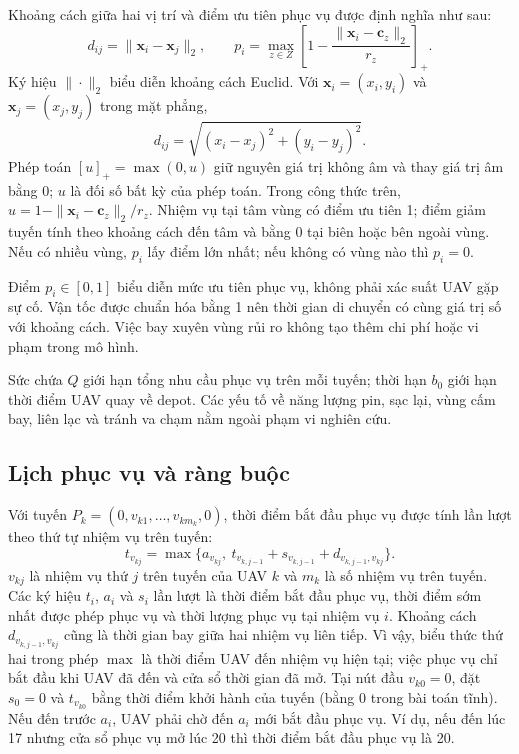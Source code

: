 \documentclass[11pt,a4paper]{article}
\begin{document}
Khoảng cách giữa hai vị trí và điểm ưu tiên phục vụ được định nghĩa như sau:
\begin{equation}
 d_{ij}=\|\mathbf{x}_i-\mathbf{x}_j\|_2,\qquad
 p_i=\max_{z\in Z}\left[1-\frac{\|\mathbf{x}_i-\mathbf{c}_z\|_2}{r_z}\right]_+.
\end{equation}
Ký hiệu $\|\cdot\|_2$ biểu diễn khoảng cách Euclid. Với $\mathbf{x}_i=(x_i,y_i)$ và $\mathbf{x}_j=(x_j,y_j)$ trong mặt phẳng,
\[
 d_{ij}=\sqrt{(x_i-x_j)^2+(y_i-y_j)^2}.
\]
Phép toán $[u]_+=\max(0,u)$ giữ nguyên giá trị không âm và thay giá trị âm bằng 0; $u$ là đối số bất kỳ của phép toán. Trong công thức trên, $u=1-\|\mathbf{x}_i-\mathbf{c}_z\|_2/r_z$. Nhiệm vụ tại tâm vùng có điểm ưu tiên 1; điểm giảm tuyến tính theo khoảng cách đến tâm và bằng 0 tại biên hoặc bên ngoài vùng. Nếu có nhiều vùng, $p_i$ lấy điểm lớn nhất; nếu không có vùng nào thì $p_i=0$.

Điểm $p_i\in[0,1]$ biểu diễn mức ưu tiên phục vụ, không phải xác suất UAV gặp sự cố. Vận tốc được chuẩn hóa bằng 1 nên thời gian di chuyển có cùng giá trị số với khoảng cách. Việc bay xuyên vùng rủi ro không tạo thêm chi phí hoặc vi phạm trong mô hình.

Sức chứa $Q$ giới hạn tổng nhu cầu phục vụ trên mỗi tuyến; thời hạn $b_0$ giới hạn thời điểm UAV quay về depot. Các yếu tố về năng lượng pin, sạc lại, vùng cấm bay, liên lạc và tránh va chạm nằm ngoài phạm vi nghiên cứu.

\subsection{Lịch phục vụ và ràng buộc}
Với tuyến $P_k=(0,v_{k1},\ldots,v_{km_k},0)$, thời điểm bắt đầu phục vụ được tính lần lượt theo thứ tự nhiệm vụ trên tuyến:
\begin{equation}
 t_{v_{kj}}=\max\{a_{v_{kj}},\ t_{v_{k,j-1}}+s_{v_{k,j-1}}+d_{v_{k,j-1},v_{kj}}\}.
\end{equation}
$v_{kj}$ là nhiệm vụ thứ $j$ trên tuyến của UAV $k$ và $m_k$ là số nhiệm vụ trên tuyến. Các ký hiệu $t_i$, $a_i$ và $s_i$ lần lượt là thời điểm bắt đầu phục vụ, thời điểm sớm nhất được phép phục vụ và thời lượng phục vụ tại nhiệm vụ $i$. Khoảng cách $d_{v_{k,j-1},v_{kj}}$ cũng là thời gian bay giữa hai nhiệm vụ liên tiếp. Vì vậy, biểu thức thứ hai trong phép $\max$ là thời điểm UAV đến nhiệm vụ hiện tại; việc phục vụ chỉ bắt đầu khi UAV đã đến và cửa sổ thời gian đã mở. Tại nút đầu $v_{k0}=0$, đặt $s_0=0$ và $t_{v_{k0}}$ bằng thời điểm khởi hành của tuyến (bằng 0 trong bài toán tĩnh). Nếu đến trước $a_i$, UAV phải chờ đến $a_i$ mới bắt đầu phục vụ. Ví dụ, nếu đến lúc 17 nhưng cửa sổ phục vụ mở lúc 20 thì thời điểm bắt đầu phục vụ là 20.
\end{document}
